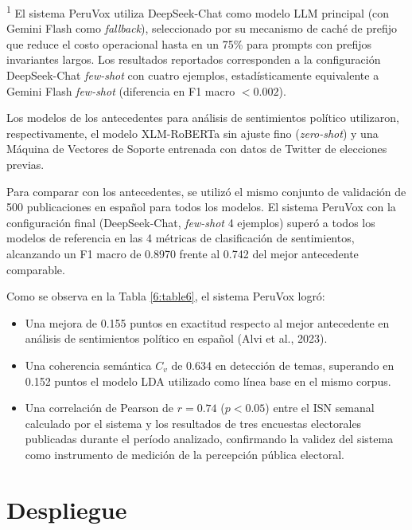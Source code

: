 \documentclass[listof=nochaptergap,12pt,times,authoryear]{report}
\begin{document}
\begin{table}[h!]
\begin{flushleft}
        \textsuperscript{1} El sistema PeruVox utiliza DeepSeek-Chat como modelo LLM principal (con Gemini Flash como \textit{fallback}), seleccionado por su mecanismo de caché de prefijo que reduce el costo operacional hasta en un 75\% para prompts con prefijos invariantes largos. Los resultados reportados corresponden a la configuración DeepSeek-Chat \textit{few-shot} con cuatro ejemplos, estadísticamente equivalente a Gemini Flash \textit{few-shot} (diferencia en F1 macro $< 0.002$).
    \end{flushleft}
\end{table}

Los modelos de los antecedentes para análisis de sentimientos político utilizaron,
respectivamente, el modelo XLM-RoBERTa sin ajuste fino (\textit{zero-shot}) y una
Máquina de Vectores de Soporte entrenada con datos de Twitter de elecciones previas.

Para comparar con los antecedentes, se utilizó el mismo conjunto de validación de
500 publicaciones en español para todos los modelos. El sistema PeruVox con la
configuración final (DeepSeek-Chat, \textit{few-shot} 4 ejemplos) superó a todos
los modelos de referencia en las 4 métricas de clasificación de sentimientos,
alcanzando un F1 macro de 0.8970 frente al 0.742 del mejor antecedente comparable.

Como se observa en la Tabla \ref{6:table6}, el sistema PeruVox logró:
\begin{itemize}
    \item Una mejora de 0.155 puntos en exactitud respecto al mejor antecedente en
    análisis de sentimientos político en español (Alvi et al., 2023).
    \item Una coherencia semántica $C_v$ de 0.634 en detección de temas, superando en
    0.152 puntos el modelo LDA utilizado como línea base en el mismo corpus.
    \item Una correlación de Pearson de $r = 0.74$ ($p < 0.05$) entre el ISN semanal
    calculado por el sistema y los resultados de tres encuestas electorales publicadas
    durante el período analizado, confirmando la validez del sistema como instrumento
    de medición de la percepción pública electoral.
\end{itemize}

\section{Despliegue}
\end{document}
